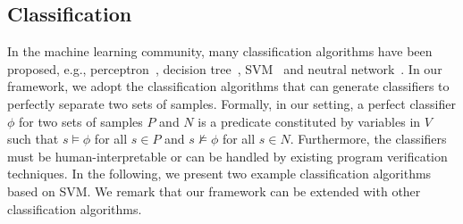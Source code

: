 \subsection{Classification}
In the machine learning community, many classification algorithms have been proposed, e.g., perceptron~\cite{???}, decision tree~\cite{???}, SVM~\cite{???} and neutral network~\cite{???}.
In our framework, we adopt the classification algorithms that can generate classifiers to perfectly separate two sets of samples. Formally, in our setting, a perfect classifier $\phi$ for two sets of samples $P$ and $N$ is a predicate constituted by variables in $V$ such that $s \models \phi$ for all $s \in P$ and $s \not \models \phi$ for all $s \in N$. Furthermore, the classifiers must be human-interpretable or can be handled by existing program verification techniques. In the following, we present two example classification algorithms based on SVM.
We remark that our framework can be extended with other classification algorithms.

